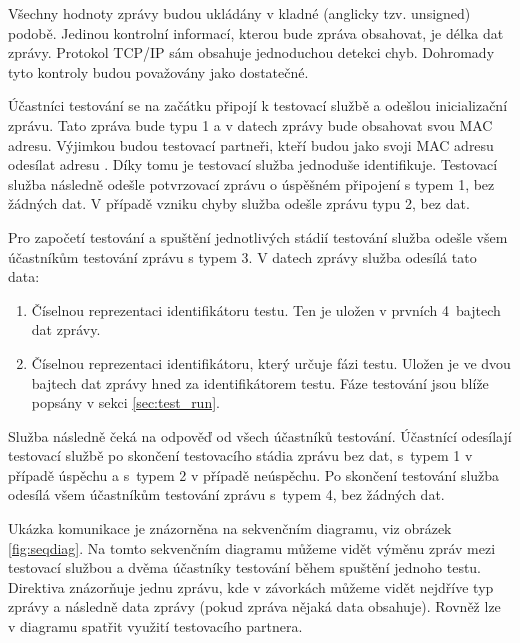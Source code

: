 Všechny hodnoty zprávy budou ukládány v kladné (anglicky tzv. unsigned) podobě. Jedinou kontrolní informací, kterou bude zpráva obsahovat, je délka dat zprávy. Protokol TCP/IP sám obsahuje jednoduchou detekci chyb. Dohromady tyto kontroly budou považovány jako dostatečné.

Účastníci testování se na začátku připojí k testovací službě a odešlou inicializační zprávu. Tato zpráva bude typu 1 a v datech zprávy bude obsahovat svou MAC adresu. Výjimkou budou testovací partneři, kteří budou jako svoji MAC adresu odesílat adresu . Díky tomu je testovací služba jednoduše identifikuje. Testovací služba následně odešle potvrzovací zprávu o úspěšném připojení s typem 1, bez žádných dat. V případě vzniku chyby služba odešle zprávu typu 2, bez dat. 

Pro započetí testování a spuštění jednotlivých stádií testování služba odešle všem účastníkům testování zprávu s typem 3. V datech zprávy služba odesílá tato data:

\begin{enumerate}
    \item Číselnou reprezentaci identifikátoru testu. Ten je uložen v prvních 4~bajtech dat zprávy.
    \item Číselnou reprezentaci identifikátoru, který určuje fázi testu. Uložen je ve dvou bajtech dat zprávy hned za identifikátorem testu. Fáze testování jsou blíže popsány v sekci \ref{sec:test_run}.
\end{enumerate}

Služba následně čeká na odpověď od všech účastníků testování. Účastnící odesílají testovací službě po skončení testovacího stádia zprávu bez dat, s~typem 1 v případě úspěchu a s~typem 2 v případě neúspěchu. Po skončení testování služba odesílá všem účastníkům testování zprávu s~typem 4, bez žádných dat. 

Ukázka komunikace je znázorněna na sekvenčním diagramu, viz obrázek \ref{fig:seqdiag}. Na tomto sekvenčním diagramu můžeme vidět výměnu zpráv mezi testovací službou a dvěma účastníky testování během spuštění jednoho testu. Direktiva  znázorňuje jednu zprávu, kde v závorkách můžeme vidět nejdříve typ zprávy a následně data zprávy (pokud zpráva nějaká data obsahuje). Rovněž lze v diagramu spatřit využití testovacího partnera.

